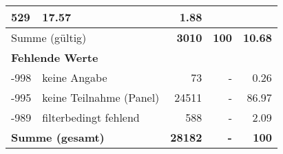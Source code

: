 \begin{longtable}{lXrrr}
       \num{529} &
       \num[round-mode=places,round-precision=2]{17.57} &
         \num[round-mode=places,round-precision=2]{1.88} \\
     \midrule
     \multicolumn{2}{l}{Summe (gültig)} &
       \textbf{\num{3010}} &
     \textbf{100} &
       \textbf{\num[round-mode=places,round-precision=2]{10.68}} \\
     \multicolumn{5}{l}{\textbf{Fehlende Werte}}\\
       -998 &
       keine Angabe &
         \num{73} &
        - &
         \num[round-mode=places,round-precision=2]{0.26} \\
       -995 &
       keine Teilnahme (Panel) &
         \num{24511} &
        - &
         \num[round-mode=places,round-precision=2]{86.97} \\
       -989 &
       filterbedingt fehlend &
         \num{588} &
        - &
         \num[round-mode=places,round-precision=2]{2.09} \\
     \midrule
     \multicolumn{2}{l}{\textbf{Summe (gesamt)}} &
          \textbf{\num{28182}} &
        \textbf{-} &
        \textbf{100} \\
     \bottomrule
     \end{longtable}
     
